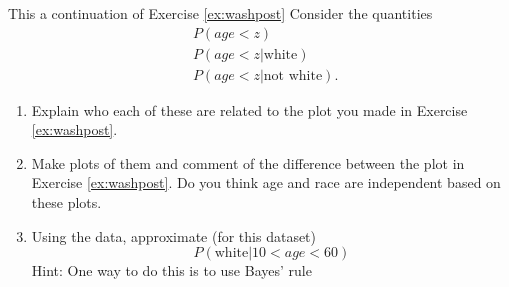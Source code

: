 \begin{exercise}

This a continuation of Exercise \ref{ex:washpost}
Consider the quantities
\begin{align*}
&P(age <z)\\
&P(age <z|\text{white})\\
&P(age <z|\text{not white}).
\end{align*}
\begin{enumerate}[label=(\alph*)]
\item Explain who each of these are related to the plot you made in Exercise \ref{ex:washpost}. 
\item Make plots of them and comment of the difference between the plot in Exercise \ref{ex:washpost}. Do you think age and race are independent based on these plots. 
\item Using the data, approximate (for this dataset) 
\begin{equation*}
P(\text{white}| 10<age<60)
\end{equation*}
Hint: One way to do this is to use Bayes' rule 
\end{enumerate}

\end{exercise}


